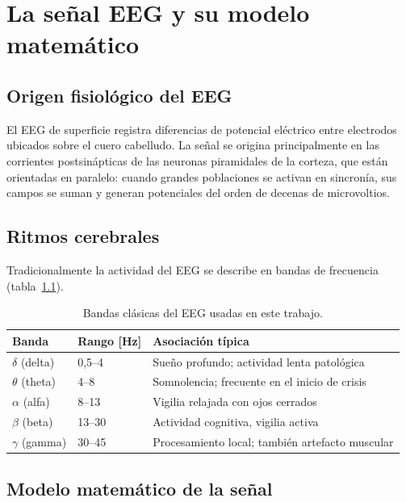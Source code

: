 \chapter{La señal EEG y su modelo matemático}
\label{cap:senal}

\section{Origen fisiológico del EEG}

El EEG de superficie registra diferencias de potencial eléctrico entre electrodos ubicados sobre el cuero cabelludo. La señal se origina principalmente en las corrientes postsinápticas de las neuronas piramidales de la corteza, que están orientadas en paralelo: cuando grandes poblaciones se activan en sincronía, sus campos se suman y generan potenciales del orden de decenas de microvoltios.


\section{Ritmos cerebrales}

Tradicionalmente la actividad del EEG se describe en bandas de frecuencia (tabla~\ref{tab:bandas}).

\begin{table}[ht]
\centering
\caption{Bandas clásicas del EEG usadas en este trabajo.}
\label{tab:bandas}
\begin{tabular}{@{}llp{7cm}@{}}
\toprule
Banda & Rango [Hz] & Asociación típica \\
\midrule
$\delta$ (delta) & 0,5--4 & Sueño profundo; actividad lenta patológica \\
$\theta$ (theta) & 4--8 & Somnolencia; frecuente en el inicio de crisis \\
$\alpha$ (alfa) & 8--13 & Vigilia relajada con ojos cerrados \\
$\beta$ (beta) & 13--30 & Actividad cognitiva, vigilia activa \\
$\gamma$ (gamma) & 30--45 & Procesamiento local; también artefacto muscular \\
\bottomrule
\end{tabular}
\end{table}

\section{Modelo matemático de la señal}

